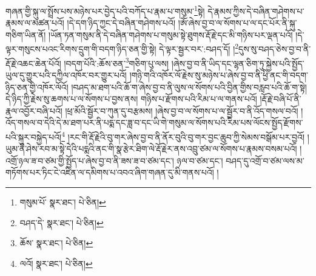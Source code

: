 གཞན་གྱི་སྐུ་ལ་སྤྲོས་པས་མཉེས་པར་བྱེད་པའི་བཀོད་པ་རྣམ་པ་གསུམ་\footnote{གསུམ་པོ་  སྣར་ཐང་།  པེ་ཅིན། }སྟེ། དེ་རྣམས་ཀྱིས་དེ་བཞིན་གཤེགས་པ་རྣམས་ལ་མཚན་པའོ། །དེ་དག་ཉིད་ཀྱང་དེ་བཞིན་གཤེགས་པའོ། །ཨོཾ་ཞེས་བྱ་བ་ལ་སོགས་པ་ལ་དང་པོར་ནི་སྐུ་གཅིག་ཡིན་ནོ། །ཡོན་ཏན་གསུམ་ནི་དེ་བཞིན་གཤེགས་པ་གསུམ་སྟེ་ཐུགས་རྡོ་རྗེ་དང་མི་གཉིས་པར་ལྡན་པའོ། །དེ་ལྟར་གསུངས་པའང་རིགས་དྲུག་གི་བདག་ཉིད་ཅན་གྱི་སྟེ། དེ་ལྟར་སྦྱར་བར་:བཤད་དོ། །\footnote{བཤད་དེ་  སྣར་ཐང་།  པེ་ཅིན། }དུས་སུ་བཤད་ཅེས་བྱ་བ་ནི་རྡོ་རྗེ་འཆང་ཆེན་པོའོ། །བདག་པོའི་:ཆོས་ཅན་\footnote{ཆོས་  སྣར་ཐང་།  པེ་ཅིན། }གཅིག་པུ་ལས། །ཞེས་བྱ་བ་ནི་ཡིད་དང་ལྷན་ཅིག་ཏུ་སྐྱེས་པའི་སྤྱོད་ཡུལ་དུ་གྱུར་པའི་དཀྱིལ་འཁོར་བར་གྱུར་པའོ། །གཉི་གའི་འཁོར་ལོ་རྗེས་སུ་མཉེས་པ་ཞེས་བྱ་བ་ནི་ཕྱི་ནང་གི་བདག་ཉིད་ཅན་གྱི་འཁོར་ལོའོ། །བཤད་མ་ཐག་པའི་ཆོ་ག་ཞེས་བྱ་བ་ནི་ལུས་ལ་སོགས་པའི་བྱིན་གྱིས་བརླབ་པའི་ཆོ་ག་སྟེ། དེ་ཉིད་ཀྱི་རྗེས་སུ་ཆགས་པ་ལ་སོགས་པ་བྱས་ནས། གཉིས་པ་རྫོགས་པའི་རིམ་པ་ལ་གནས་པའོ། །རྡོ་རྗེ་བཞི་པོ་ནི་རྣལ་འབྱོར་བཞི་པའོ། །ཕྲ་མོའི་སྦྱོར་བ་ཀུན་དུ་བརྩམས། །ཞེས་བྱ་བ་ལ་སོགས་པ་ལ་སྦྱོར་བ་ནི་འོད་གསལ་བའོ། །འོད་གསལ་བ་དེའི་དེ་མ་ཐག་པར་ནི་པདྨ་དང་ཟླ་བ་དང་ཡི་གེ་གསུམ་ལ་སོགས་པའི་རིམ་པས་ལོངས་སྤྱོད་རྫོགས་པའི་སྐུར་བསྐྱེད་པའོ།\footnote{ལའོ།  སྣར་ཐང་།  པེ་ཅིན། } །རང་གི་རྡོ་རྗེའི་བུ་གར་ཞེས་བྱ་བ་ནི་ནོར་བུའི་བུ་གར་བྱང་ཆུབ་ཀྱི་སེམས་བསྒོམ་པར་བྱའོ། །ཡུམ་ནི་ཤེས་རབ་མ་སྟེ་དེའི་པདྨའི་ནང་གི་སྣ་རྩེར་ཐིག་ལེ་རྡོ་རྗེར་ནས་འབྲུ་ཙམ་ལ་སོགས་པ་རྣམས་བསམ་པའོ། །འགྲོ་ཉལ་ཟ་བ་ཙམ་གྱི་སྤྱོད་པ་ཞེས་བྱ་བ་ནི་ཟས་ཟ་བ་ཙམ་དང་། ཉལ་བ་ཙམ་དང་། བཤད་དུ་འགྲོ་བ་ཙམ་ལས་མ་གཏོགས་པར་ཏིང་ངེ་འཛིན་ལ་དམིགས་པ་འབའ་ཞིག་གཞན་དུ་མི་གནས་པའོ། །
